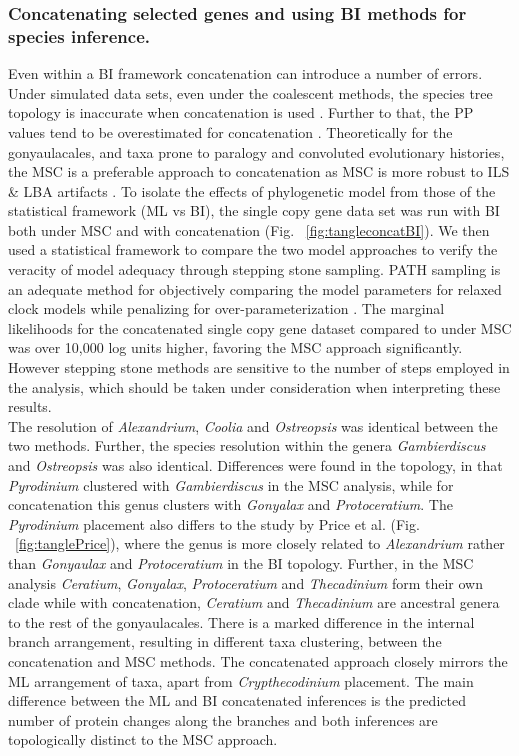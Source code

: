 \documentclass[fleqn,10pt,lineno]{wlpeerj} %
\begin{document}
\subsubsection*{Concatenating selected genes and using BI methods for species inference.}
Even within a BI framework concatenation can introduce a number of errors. 
Under simulated data sets, even under the coalescent methods, the species tree topology is inaccurate when concatenation is used \cite{kubatko2007inconsistency}. 
Further to that, the PP values tend to be overestimated for concatenation \cite{suzuki2002overcredibility}. 
Theoretically for the gonyaulacales, and taxa prone to paralogy and convoluted evolutionary histories, the MSC is a preferable approach to concatenation as MSC is more robust to ILS \& LBA artifacts \cite{liu2014coalescent}. 
To isolate the effects of phylogenetic model from those of the statistical framework (ML vs BI), the single copy gene data set was run with BI both under MSC and with concatenation (Fig. ~\ref{fig:tangleconcatBI}). 
We then used a statistical framework to compare the two model approaches to verify the veracity of model adequacy through stepping stone sampling. 
PATH sampling is an adequate method for objectively comparing the model parameters for relaxed clock models while penalizing for over-parameterization \cite{baele2012accurate}. 
The marginal likelihoods for the concatenated single copy gene dataset compared to under MSC was over 10,000 log units higher, favoring the MSC approach significantly.
However stepping stone methods are sensitive to the number of steps employed in the analysis, which should be taken under consideration when interpreting these results. \\
The resolution of \textit{Alexandrium}, \textit{Coolia} and \textit{Ostreopsis} was identical between the two methods. 
Further, the species resolution within the genera \textit{Gambierdiscus} and \textit{Ostreopsis} was also identical. 
Differences were found in the topology, in that \textit{Pyrodinium} clustered with \textit{Gambierdiscus} in the MSC analysis, while for concatenation this genus clusters with \textit{Gonyalax} and \textit{Protoceratium}. 
The \textit{Pyrodinium} placement also differs to the study by Price et al. (Fig. ~\ref{fig:tanglePrice}), where the genus is more closely related to \textit{Alexandrium} rather than \textit{Gonyaulax} and \textit{Protoceratium} in the BI topology. 
Further, in the MSC analysis \textit{Ceratium}, \textit{Gonyalax}, \textit{Protoceratium} and \textit{Thecadinium} form their own clade while with concatenation, \textit{Ceratium} and \textit{Thecadinium} are ancestral genera to the rest of the gonyaulacales. 
There is a marked difference in the internal branch arrangement, resulting in different taxa clustering, between the concatenation and MSC methods.
The concatenated approach closely mirrors the ML arrangement of taxa, apart from \textit{Crypthecodinium} placement. 
The main difference between the ML and BI concatenated inferences is the predicted number of protein changes along the branches and both inferences are topologically distinct to the MSC approach.
\end{document}
